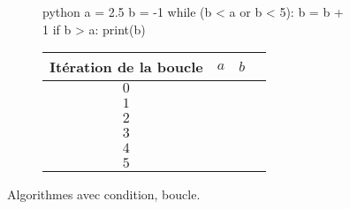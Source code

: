 \begin{figure}[h]
\begin{subfigure}{.5\textwidth}
\vspace{15pt}
\begin{mintedbox}{python}
a = 2.5
b = -1
while (b < a or b < 5):
	b = b + 1
	if b > a:
		print(b)
\end{mintedbox}
\end{subfigure}
\hfill
\begin{subfigure}{.45\textwidth}
	\begin{tabular}{|c|c|c|c|}\hline
		Itération de la boucle & $a$ & $b$ \\ \hline
		$0$ && \\ \hline
		$1$ && \\ \hline
		$2$ && \\ \hline
		$3$ && \\ \hline
		$4$ && \\ \hline
		$5$ && \\ \hline
	\end{tabular}
\end{subfigure}

\caption{Algorithmes avec condition, boucle.}
\label{fig:2}
\end{figure}




